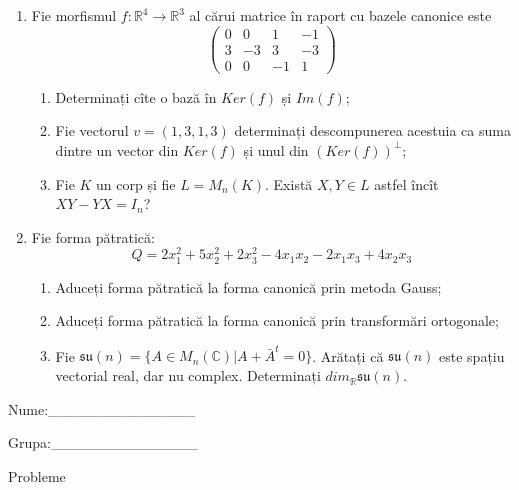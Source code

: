 \documentclass{article}
\begin{document}
\begin{enumerate}
 \item Fie morfismul $f:\mathbb{R}^4 \to \mathbb{R}^3$ al cărui matrice în raport cu bazele canonice este
$$\begin{pmatrix}
0&0&1&-1\\
3&-3&3&-3\\
0&0&-1&1
\end{pmatrix}$$

\begin{enumerate}
\item Determinați cîte o bază în $Ker(f)$ și $Im(f)$;
\item Fie vectorul $v=(1,3,1,3)$ determinați descompunerea acestuia ca suma dintre un vector din $Ker(f)$ și unul din $(Ker(f))^\perp$;
\item Fie $K$ un corp și fie $L=M_n(K)$. Există $X,Y \in L$ astfel încît $XY-YX=I_n$?  
\end{enumerate}
\item Fie forma pătratică:
$$Q= 2x_1^2+5x_2^2+2x_3^2-4x_1x_2-2x_1x_3+4x_2x_3$$

\begin{enumerate}
\item Aduceți forma pătratică la forma canonică prin metoda Gauss;
\item Aduceți forma pătratică la forma canonică prin transformări ortogonale;
\item Fie $\mathfrak{su}(n)=\{ A \in M_n(\mathbb{C}) | A+\bar{A}^t=0\}$. Arătați că $\mathfrak{su}(n)$ este spațiu vectorial real, dar nu complex.
Determinați $dim_{\mathbb{R}}\mathfrak{su}(n)$.
\end{enumerate}
\end{enumerate}
\newpage
\begin{flushright}
Nume:\_\_\_\_\_\_\_\_\_\_\_\_\_\_
 
 
Grupa:\_\_\_\_\_\_\_\_\_\_\_\_\_\_
\end{flushright}
\begin{center}
\vspace{2cm}
{\Large Probleme}
\vspace{2cm}
\end{center}
\end{document}
